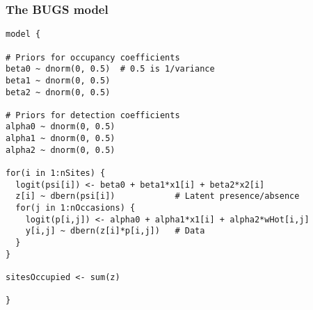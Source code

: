 \documentclass[color=usenames,dvipsnames]{beamer}\usepackage[]{graphicx}\usepackage[]{color}
\makeatletter
\newenvironment{kframe}{%
 \def\at@end@of@kframe{}%
 \ifinner\ifhmode%
  \def\at@end@of@kframe{\end{minipage}}%
  \begin{minipage}{\columnwidth}%
 \fi\fi%
 \def\FrameCommand##1{\hskip\@totalleftmargin \hskip-\fboxsep
 \colorbox{shadecolor}{##1}\hskip-\fboxsep
     \hskip-\linewidth \hskip-\@totalleftmargin \hskip\columnwidth}%
 \MakeFramed {\advance\hsize-\width
   \@totalleftmargin\z@ \linewidth\hsize
   \@setminipage}}%
 {\par\unskip\endMakeFramed%
 \at@end@of@kframe}
\newenvironment{knitrout}{}{} %
\makeatother
\begin{document}
\begin{frame}[fragile]
  \frametitle{The BUGS model}
\begin{knitrout}\scriptsize
{}\color{fgcolor}\begin{kframe}
\begin{verbatim}
model {

# Priors for occupancy coefficients
beta0 ~ dnorm(0, 0.5)  # 0.5 is 1/variance
beta1 ~ dnorm(0, 0.5)
beta2 ~ dnorm(0, 0.5)

# Priors for detection coefficients
alpha0 ~ dnorm(0, 0.5)  
alpha1 ~ dnorm(0, 0.5)
alpha2 ~ dnorm(0, 0.5)

for(i in 1:nSites) {
  logit(psi[i]) <- beta0 + beta1*x1[i] + beta2*x2[i]
  z[i] ~ dbern(psi[i])            # Latent presence/absence
  for(j in 1:nOccasions) {
    logit(p[i,j]) <- alpha0 + alpha1*x1[i] + alpha2*wHot[i,j]
    y[i,j] ~ dbern(z[i]*p[i,j])   # Data
  }
}

sitesOccupied <- sum(z)

}
\end{verbatim}
\end{kframe}
\end{knitrout}
\end{frame}



\end{document}
